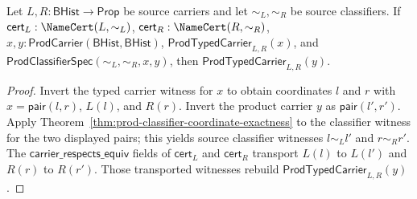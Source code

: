 \begin{theorem}
\label{thm:product-typed-carrier-transport-source-certificates}
Let $L,R:\mathsf{BHist}\to\mathsf{Prop}$ be source carriers and let
$\sim_L,\sim_R$ be source classifiers. If
$\mathsf{cert}_L:\NameCert(L,\sim_L)$,
$\mathsf{cert}_R:\NameCert(R,\sim_R)$,
$x,y:\mathsf{ProdCarrier}(\mathsf{BHist},\mathsf{BHist})$,
$\mathsf{ProdTypedCarrier}_{L,R}(x)$, and
$\mathsf{ProdClassifierSpec}(\sim_L,\sim_R,x,y)$, then
$\mathsf{ProdTypedCarrier}_{L,R}(y)$.
\end{theorem}
\begin{proof}
Invert the typed carrier witness for $x$ to obtain coordinates $l$ and $r$
with $x=\mathsf{pair}(l,r)$, $L(l)$, and $R(r)$. Invert the product carrier
$y$ as $\mathsf{pair}(l',r')$. Apply
Theorem~\ref{thm:prod-classifier-coordinate-exactness} to the classifier
witness for the two displayed pairs; this yields source classifier witnesses
$l\sim_L l'$ and $r\sim_R r'$. The
$\mathsf{carrier\_respects\_equiv}$ fields of $\mathsf{cert}_L$ and
$\mathsf{cert}_R$ transport $L(l)$ to $L(l')$ and $R(r)$ to $R(r')$.
Those transported witnesses rebuild $\mathsf{ProdTypedCarrier}_{L,R}(y)$.
\end{proof}

